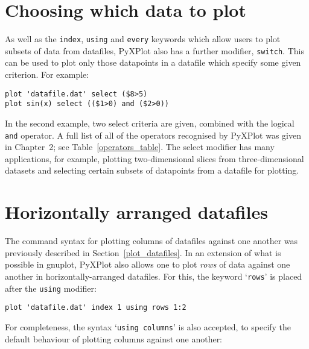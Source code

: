 \section{Choosing which data to plot}
\label{select_modifier} 
As well as the \texttt{index}, \texttt{using} and \texttt{every} keywords which
allow users to plot subsets of data from datafiles, PyXPlot also has a further
modifier, {\tt switch}. This can be used to
plot only those datapoints in a datafile which specify some given criterion. For
example:

\begin{verbatim}
plot 'datafile.dat' select ($8>5)
plot sin(x) select (($1>0) and ($2>0))
\end{verbatim}

In the second example, two select criteria are given, combined with the logical
{\tt and} operator. A full list of all of the operators recognised by PyXPlot
was given in Chapter~2; see Table~\ref{operators_table}.  The select modifier
has many applications, for example, plotting two-dimensional slices from
three-dimensional datasets and selecting certain subsets of datapoints from a
datafile for plotting.

\section{Horizontally arranged datafiles}

\label{horizontal_datafiles} The
command syntax for plotting columns of datafiles against one another was
previously described in Section~\ref{plot_datafiles}.  In an extension of what
is possible in gnuplot, PyXPlot also allows one to plot \textit{rows} of data
against one another in horizontally-arranged datafiles.  For this, the keyword
`\texttt{rows}' is placed after the \texttt{using} modifier:

\begin{verbatim}
plot 'datafile.dat' index 1 using rows 1:2
\end{verbatim}

\noindent For completeness, the syntax `\texttt{using columns}' is also
accepted, to specify the default behaviour of plotting columns against one
another:

